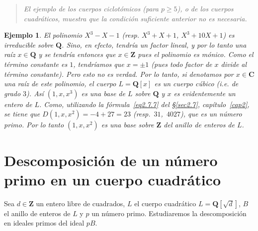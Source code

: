\documentclass[bibtotoc,leqno,spanish]{amsbook}
\newcommand{\QQ}{\mathbf{Q}}
\newcommand{\ZZ}{\mathbf{Z}}
\newcommand{\CC}{\mathbf{C}}
\numberwithin{equation}{section}
\newenvironment{comm}%
	{\begin{quotation}\itshape}
	{\end{quotation}}
\theoremstyle{note}
\theoremstyle{note}
\theoremstyle{rem}
\newtheorem*{example*}{Ejemplo}
\numberwithin{theorem}{section}
\numberwithin{proposition}{section}
\numberwithin{definition}{section}
\numberwithin{lemma}{section}
\numberwithin{corollary}{section}
\numberwithin{example}{section}
\numberwithin{footnote}{section}%
\begin{document}
\begin{comm}
El ejemplo de los cuerpos ciclot\'omicos (para $p\geq 5$), o de los cuerpos cuadr\'aticos, muestra que
la condici\'on suficiente anterior no es necesaria.
\end{comm}

\begin{example*}
El polinomio $X^{3}-X-1$ (resp. $X^{3}+X+1$, $X^{3}+10X+1$) es {\em irreducible} sobre $\QQ$.
Sino, en efecto, tendr\'ia un factor lineal, y por lo tanto una ra\'iz $x\in\QQ$ y se tendr\'ia entonces
que $x\in\ZZ$ pues el polinomio es m\'onico. Como el t\'ermino constante es $1$, tendr\'iamos que
$x=\pm 1$ (pues todo factor de $x$ divide al t\'ermino constante). Pero esto no es verdad. Por lo tanto,
si denotamos por $x\in\CC$ una ra\'iz de este polinomio, el cuerpo $L = \QQ[x]$ es un {\em cuerpo c\'ubico}
(i.e. de grado $3$). As\'i $(1,x,x^{3})$ es una base de $L$ sobre $\QQ$ y $x$ es evidentemente un entero de
$L$. Como, utilizando la f\'ormula~\eqref{eq2.7.7} del \S\ref{sec2.7}, cap\'itulo~\ref{cap2}, se tiene
que $D(1,x,x^{2}) = -4+27 = 23$ (resp.~$31$,~$4027$), que es un n\'umero primo.  Por lo tanto
$(1,x,x^{2})$ es una base sobre $\ZZ$ del anillo de enteros de $L$.
\end{example*}

\section{Descomposici\'on de un n\'umero primo en un cuerpo cuadr\'atico}\label{sec5.4}

Sea $d\in\ZZ$ un entero libre de cuadrados, $L$ el cuerpo cuadr\'atico $L = \QQ[\sqrt{d}]$,
$B$ el anillo de enteros de $L$ y $p$ un n\'umero primo. Estudiaremos la descomposici\'on en ideales
primos del ideal $pB$.
\end{document}

